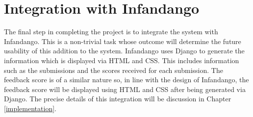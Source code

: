 \section{Integration with Infandango}
The final step in completing the project is to integrate the system with Infandango. This is a non-trivial task whose outcome will determine the future usability of this addition to the system. Infandango uses Django\cite{django_site} to generate the information which is displayed via HTML and CSS. This includes information such as the submissions and the scores received for each submission. The feedback score is of a similar nature so, in line with the design of Infandango, the feedback score will be displayed using HTML and CSS after being generated via Django. The precise details of this integration will be discussion in Chapter \ref{implementation}.

